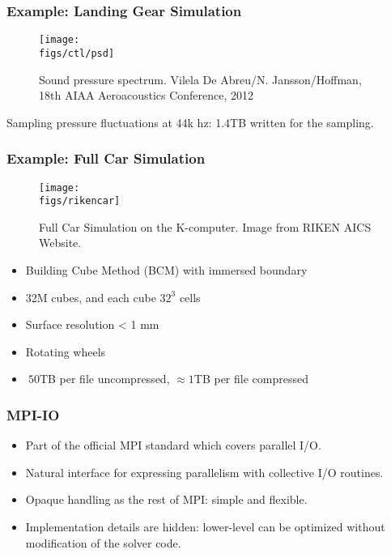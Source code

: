\begin{frame}
  \frametitle{Example: Landing Gear Simulation}

\begin{figure}
  \begin{center}
    \texttt{[image: \\figs/ctl/psd]}
  \end{center}
  \caption{Sound pressure spectrum. Vilela De Abreu/N. Jansson/Hoffman, 18th AIAA Aeroacoustics Conference, 2012}
\end{figure}

Sampling pressure fluctuations at 44k hz: 1.4TB written for the sampling.

\end{frame}


\begin{frame}
  \frametitle{Example: Full Car Simulation}

\begin{figure}
  \begin{center}
    \texttt{[image: \\figs/rikencar]}
  \end{center}
  \caption{
    Full Car Simulation on the K-computer. Image from RIKEN AICS Website.
  }
\label{fig:manyone}
\end{figure}

\begin{itemize}
\item Building Cube Method (BCM) with immersed boundary
\item 32M cubes, and each cube $32^3$ cells
\item Surface resolution < 1 mm
\item Rotating wheels
\item $~50$TB per file uncompressed, $\approx1$TB per file compressed
\end{itemize}
\end{frame}


\begin{frame}
  \frametitle{MPI-IO}

\begin{itemize}
\item Part of the official MPI standard which covers parallel I/O.
\item Natural interface for expressing parallelism with collective I/O routines.
\item Opaque handling as the rest of MPI: simple and flexible.
\item Implementation details are hidden: lower-level can be optimized without modification of the solver code.
\end{itemize}

\end{frame}

